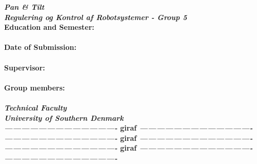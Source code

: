
\thispagestyle{empty}

\begin{center}        %
  \Huge
  \color{ColorH2}
  \textbf{\textit{Pan \& Tilt}} \\
  \huge
  \textbf{\textit{Regulering og Kontrol af Robotsystemer - Group 5}} \\
  \vspace{12mm}
  \color{Gray}
  \normalsize
  \bfseries{Education and Semester:} \\
  \Large
  \color{ColorOthers}
   \\
  \vspace{6mm}
  \color{Gray}
  \normalsize
  \bfseries{Date of Submission:} \\
  \Large
  \color{ColorOthers}
   \\
  \vspace{6mm}
  \color{Gray}
  \normalsize
  \bfseries{Supervisor:} \\
  \Large
  \color{ColorOthers}
   \\
  \vspace{6mm}
  \color{Gray}
  \normalsize
  \bfseries{Group members:} \\
  \Large
  \color{ColorOthers}
   \\
  \vspace{12mm}
  \normalsize
  \textsl{Technical Faculty} \\
  \textsl{University of Southern Denmark} \\ 
  \vspace{5mm}
  \normalsize
  \color{black}
  \textsl{----------------------------------------} \color{white} giraf \color{black}\textsl{----------------------------------------} \\
  \textsl{----------------------------------------}\color{white} giraf \color{black}\textsl{ ----------------------------------------} \\
  \textsl{----------------------------------------}\color{white} giraf \color{black}\textsl{ ----------------------------------------} \\
  \textsl{----------------------------------------} \\
\end{center}